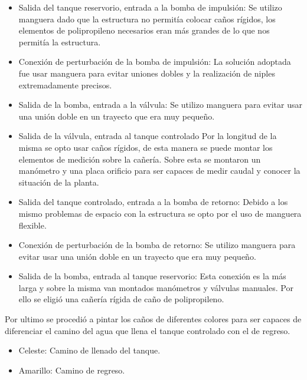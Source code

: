 \begin{itemize}
  \item Salida del tanque reservorio, entrada a la bomba de impulsión:
  Se utilizo manguera dado que la estructura no permitía colocar caños rígidos, los elementos de 
  polipropileno necesarios eran más grandes de lo que nos permitía la estructura.
 
  \item Conexión de perturbación de la bomba de impulsión:
  La solución adoptada fue usar manguera para evitar uniones dobles y la realización de niples
  extremadamente precisos.
  
  \item Salida de la bomba, entrada a la válvula:
  Se utilizo manguera para evitar usar una unión doble en un trayecto que era muy pequeño.
  
  \item Salida de la válvula, entrada al tanque controlado
  Por la longitud de la misma se opto usar caños rígidos, de esta manera se puede montar los elementos
  de medición sobre la cañería. Sobre esta se montaron un manómetro y una placa orificio para ser capaces
  de medir caudal y conocer la situación de la planta.
  
  \item Salida del tanque controlado, entrada a la bomba de retorno:
  Debido a los mismo problemas de espacio con la estructura se opto por el uso de manguera flexible.
 
  \item Conexión de perturbación de la bomba de retorno:
  Se utilizo manguera para evitar usar una unión doble en un trayecto que era muy pequeño.
  
  \item Salida de la bomba, entrada al tanque reservorio:
  Esta conexión es la más larga y sobre la misma van montados manómetros y válvulas manuales. Por ello
  se eligió una cañería rígida de caño de polipropileno.
  
 \end{itemize}

Por ultimo se procedió a pintar los caños de diferentes colores para ser capaces de diferenciar el 
camino del agua que llena el tanque controlado con el de regreso.

 \begin{itemize}
  \item Celeste: Camino de llenado del tanque.
  \item Amarillo: Camino de regreso.
 \end{itemize}


